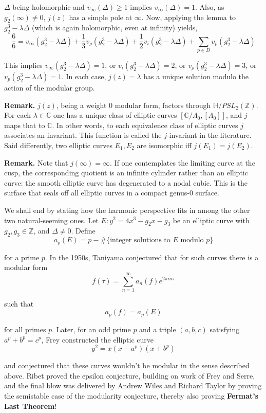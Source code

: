 \documentclass[11pt,a4paper]{article}
\begin{document}
$\Delta$ being holomorphic and $v_{\infty}(\Delta) \geq 1$ implies $v_{\infty}(\Delta) = 1$. Also, as $g_2(\infty) \neq 0$, $j(z)$ has a simple pole at $\infty$. Now, applying the lemma to $g_2^3 - \lambda\Delta$ (which is again holomorphic, even at infinity) yields,
$$\frac{6}{6} = v_{\infty}(g_2^3 - \lambda\Delta) +\frac{1}{3}v_{\rho}(g_2^3 - \lambda\Delta) + \frac{1}{2}v_{i}(g_2^3 - \lambda\Delta) + \sum_{p\in D} v_p(g_2^3 - \lambda\Delta)$$

This implies
$v_{\infty}(g_2^3 - \lambda\Delta) = 1$, or $v_{i}(g_2^3 - \lambda\Delta) = 2$, or $v_{\rho}(g_2^3 - \lambda\Delta) = 3$, or $v_p(g_2^3 - \lambda\Delta) = 1$. In each case, $j(z) = \lambda$ has a unique solution modulo the action of the modular group.

\textbf{Remark.} $j(z)$, being a weight $0$ modular form, factors through $\mathbb H/PSL_2(\mathbb{Z})$. For each $\lambda\in\mathbb C$ one has a unique class of elliptic curves $[\mathbb{C}/\Lambda_0, [\Lambda_0]]$, and $j$ maps that to $\mathbb{C}$. In other words, to each equivalence class of elliptic curves $j$ associates an invariant. This function is called the $j$-invariant in the literature. Said differently, two elliptic curves $E_1, E_2$ are isomorphic iff $j(E_1) = j(E_2)$.


\textbf{Remark.} Note that $j(\infty)=\infty$. If one contemplates the limiting curve at the cusp, the corresponding quotient is an infinite cylinder rather than an elliptic curve: the smooth elliptic curve has degenerated to a nodal cubic. This is the surface that seals off all elliptic curves in a compact genus-$0$ surface.

We shall end by stating how the harmonic perspective fits in among the other two natural-seeming ones. Let $E: y^2 = 4x^3 - g_2x - g_3$ be an elliptic curve with $g_2, g_3 \in \mathbb{Z}$, and $\Delta \neq 0$. Define
$$a_p(E) = p - \#\{\text{integer solutions to $E$ modulo $p$}\}$$

for a prime $p$. In the 1950s, Taniyama conjectured that for such curves there is a modular form
$$f(\tau) = \sum_{n = 1}^{\infty}a_n(f)e^{2\pi i n\tau}$$

such that
$$a_p(f) = a_p(E)$$

for all primes $p$. Later, for an odd prime $p$ and a triple $(a,b,c)$ satisfying $a^p+b^p=c^p$, Frey constructed the elliptic curve
$$y^2 = x(x-a^p)(x+b^p)$$

and conjectured that these curves wouldn't be modular in the sense described above. Ribet proved the epsilon conjecture, building on work of Frey and Serre, and the final blow was delivered by Andrew Wiles and Richard Taylor by proving the semistable case of the modularity conjecture, thereby also proving \textbf{Fermat's Last Theorem}!
\end{document}
